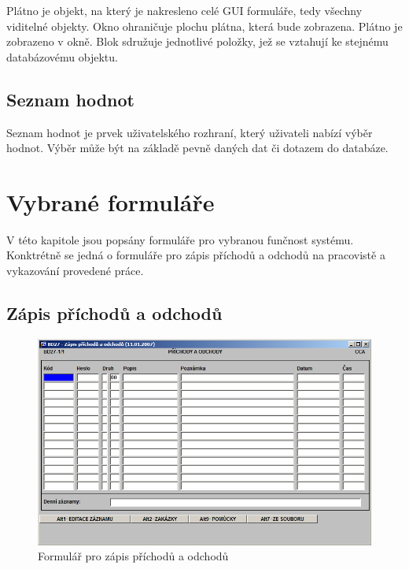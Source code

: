 \documentclass{diplomka}
\begin{document}
Plátno je objekt, na který je nakresleno celé GUI formuláře, tedy všechny viditelné objekty.  Okno ohraničuje plochu plátna, která bude zobrazena. Plátno je zobrazeno v okně. Blok sdružuje jednotlivé položky, jež se vztahují ke stejnému databázovému objektu.
\vspace{-3mm}
\subsection*{Seznam hodnot}
Seznam hodnot je prvek uživatelského rozhraní, který uživateli nabízí výběr hodnot. Výběr může být na základě pevně daných dat či dotazem do databáze.

\section{Vybrané formuláře}
V této kapitole jsou popsány formuláře pro vybranou funčnost systému. 
 Konktrétně se jedná o formuláře pro zápis příchodů a odchodů na pracovistě a vykazování provedené práce.
\subsection{Zápis příchodů a odchodů}
\begin{figure}[H]
  \centering
  \includegraphics[scale=0.65]{obr/BD27.png}
\caption{Formulář pro zápis příchodů a odchodů}
\label{fig:att}
\end{figure}
\end{document}
